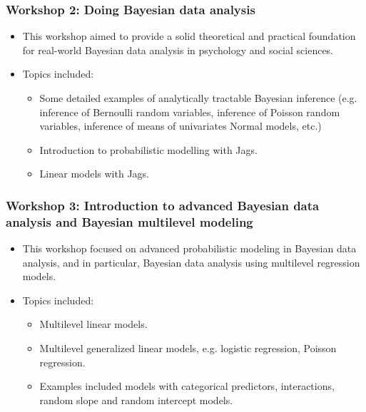 \begin{frame}
	\frametitle{Workshop 2: Doing Bayesian data analysis}

	\begin{itemize}
		\item This workshop aimed to provide a solid theoretical and practical foundation for real-world Bayesian data analysis in psychology and social sciences.
		\item Topics included:
			\begin{itemize}
				\item Some detailed examples of analytically tractable Bayesian inference (e.g. inference of Bernoulli random variables, inference of Poisson random variables, inference of means of univariates Normal models, etc.)
				\item Introduction to probabilistic modelling with Jags.
				\item Linear models with Jags.
			\end{itemize}

	\end{itemize}

\end{frame}

\begin{frame}
	\frametitle{Workshop 3: Introduction to advanced Bayesian data analysis and Bayesian multilevel modeling}

	\begin{itemize}
		\item This workshop focused on advanced probabilistic modeling
			in Bayesian data analysis, and in particular, Bayesian
			data analysis using multilevel regression models.
		\item Topics included:
			\begin{itemize}
				\item Multilevel linear models.
				\item Multilevel generalized linear models, e.g. logistic regression, Poisson regression.
				\item Examples included models with categorical predictors, interactions, random slope and random intercept models.
			\end{itemize}
	\end{itemize}

\end{frame}

